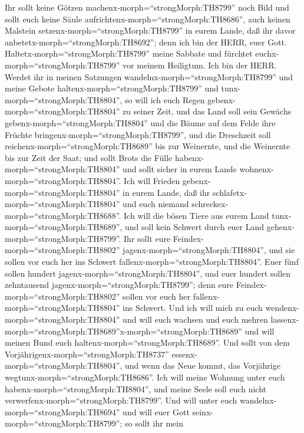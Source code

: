  Ihr sollt keine Götzen machenx-morph=``strongMorph:TH8799''
noch Bild und sollt euch keine Säule
aufrichtenx-morph=``strongMorph:TH8686'', auch keinen Malstein
setzenx-morph=``strongMorph:TH8799'' in eurem Lande, daß ihr davor
anbetetx-morph=``strongMorph:TH8692''; denn ich bin der HERR, euer Gott.
 Haltetx-morph=``strongMorph:TH8799'' meine Sabbate und
fürchtet euchx-morph=``strongMorph:TH8799'' vor meinem Heiligtum. Ich
bin der HERR.  Werdet ihr in meinen Satzungen
wandelnx-morph=``strongMorph:TH8799'' und meine Gebote
haltenx-morph=``strongMorph:TH8799'' und
tunx-morph=``strongMorph:TH8804'',  so will ich euch Regen
gebenx-morph=``strongMorph:TH8804'' zu seiner Zeit, und das Land soll
sein Gewächs gebenx-morph=``strongMorph:TH8804'' und die Bäume auf dem
Felde ihre Früchte bringenx-morph=``strongMorph:TH8799'', 
und die Dreschzeit soll reichenx-morph=``strongMorph:TH8689'' bis zur
Weinernte, und die Weinernte bis zur Zeit der Saat; und sollt Brots die
Fülle habenx-morph=``strongMorph:TH8804'' und sollt sicher in eurem
Lande wohnenx-morph=``strongMorph:TH8804''.  Ich will
Frieden gebenx-morph=``strongMorph:TH8804'' in eurem Lande, daß ihr
schlafetx-morph=``strongMorph:TH8804'' und euch niemand
schreckex-morph=``strongMorph:TH8688''. Ich will die bösen Tiere aus
eurem Land tunx-morph=``strongMorph:TH8689'', und soll kein Schwert
durch euer Land gehenx-morph=``strongMorph:TH8799''.  Ihr
sollt eure Feindex-morph=``strongMorph:TH8802''
jagenx-morph=``strongMorph:TH8804'', und sie sollen vor euch her ins
Schwert fallenx-morph=``strongMorph:TH8804''.  Euer fünf
sollen hundert jagenx-morph=``strongMorph:TH8804'', und euer hundert
sollen zehntausend jagenx-morph=``strongMorph:TH8799''; denn eure
Feindex-morph=``strongMorph:TH8802'' sollen vor euch her
fallenx-morph=``strongMorph:TH8804'' ins Schwert.  Und ich
will mich zu euch wendenx-morph=``strongMorph:TH8804'' und will euch
wachsen und euch mehren
lassenx-morph=``strongMorph:TH8689''x-morph=``strongMorph:TH8689'' und
will meinen Bund euch haltenx-morph=``strongMorph:TH8689''.
 Und sollt von dem
Vorjährigenx-morph=``strongMorph:TH8737''
essenx-morph=``strongMorph:TH8804'', und wenn das Neue kommt, das
Vorjährige wegtunx-morph=``strongMorph:TH8686''.  Ich will
meine Wohnung unter euch habenx-morph=``strongMorph:TH8804'', und meine
Seele soll euch nicht verwerfenx-morph=``strongMorph:TH8799''.
 Und will unter euch wandelnx-morph=``strongMorph:TH8694''
und will euer Gott seinx-morph=``strongMorph:TH8799''; so sollt ihr mein
